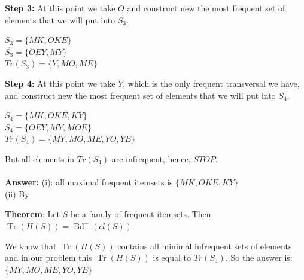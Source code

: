 \documentclass{article}
\begin{document}
  \textbf{Step 3:}
  At this point we take $O$ and construct new the most frequent set of elements that we will put into $S_3$.
  \begin{center}
    $S_3 = \{MK, OKE\}$ \\
    $\overline{S_3} = \{OEY, MY\}$ \\
    $Tr(S_3) = \{Y, MO, ME\}$
  \end{center}

  \textbf{Step 4:}
  At this point we take $Y$, which is the only frequent transversal we have,
  and construct new the most frequent set of elements that we will put into $S_4$.
  \begin{center}
    $S_4 = \{MK, OKE, KY\}$ \\
    $\overline{S_4} = \{OEY, MY, MOE\}$ \\
    $Tr(S_4) = \{MY, MO, ME, YO, YE\}$
  \end{center}
  But all elements in $Tr(S_4)$ are infrequent, hence, $STOP$.
  \\
  \\
  \textbf{Answer:} (i): all maximal frequent itemsets is $\{MK, OKE, KY\}$ \\

  (ii) By
  \begin{center}
    \textbf{Theorem}: Let $S$ be a family of frequent itemsets. Then $\operatorname{Tr}(H(S)) = \operatorname{Bd}^{-}(cl(S))$.
  \end{center}
  We know that $\operatorname{Tr}(H(S))$ contains all minimal infrequent sets of elements and in our problem this $\operatorname{Tr}(H(S))$ is equal to $Tr(S_4)$. So the answer is: $\{MY, MO, ME, YO, YE\}$
\end{document}
